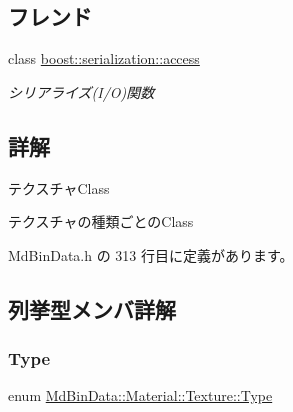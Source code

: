 \subsection*{フレンド}
\begin{DoxyCompactItemize}
\item 
class \mbox{\hyperlink{class_md_bin_data_1_1_material_1_1_texture_ac98d07dd8f7b70e16ccb9a01abf56b9c}{boost\+::serialization\+::access}}
\begin{DoxyCompactList}\small\item\em シリアライズ(I/O)関数 \end{DoxyCompactList}\end{DoxyCompactItemize}


\subsection{詳解}
テクスチャ\+Class 

テクスチャの種類ごとの\+Class 

 Md\+Bin\+Data.\+h の 313 行目に定義があります。



\subsection{列挙型メンバ詳解}
\mbox{\label{class_md_bin_data_1_1_material_1_1_texture_a30fadb7216d0650de284e2fd875868ae}} 
\subsubsection{\texorpdfstring{Type}{Type}}
{\footnotesize\ttfamily enum \mbox{\hyperlink{class_md_bin_data_1_1_material_1_1_texture_a30fadb7216d0650de284e2fd875868ae}{Md\+Bin\+Data\+::\+Material\+::\+Texture\+::\+Type}}\hspace{0.3cm}{\ttfamily [strong]}}

